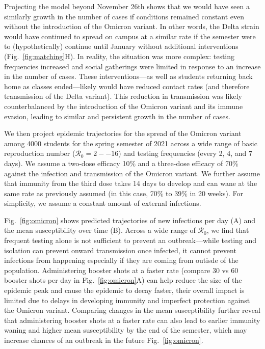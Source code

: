 \documentclass[12pt]{article}
\newcommand{\fref}[1]{Fig.~\ref{fig:#1}}
\begin{document}
Projecting the model beyond November 26th shows that we would have seen a similarly growth in the number of cases if conditions remained constant even without the introduction of the Omicron variant.
In other words, the Delta strain would have continued to spread on campus at a similar rate if the semester were to (hypothetically) continue until January without additional interventions (\fref{matching}H).
In reality, the situation was more complex:  testing frequencies increased and social gatherings were limited in response to an increase in the number of cases.
These interventions---as well as students returning back home as classes ended---likely would have reduced contact rates (and therefore transmission of the Delta variant).
This reduction in transmission was likely counterbalanced by the introduction of the Omicron variant and its immune evasion, leading to similar and persistent growth in the number of cases.

We then project epidemic trajectories for the spread of the Omicron variant among 4000 students for the spring semester of 2021 across a wide range of basic reproduction number ($\mathcal R_0 = 2--16$) and testing frequencies (every 2, 4, and 7 days).
We assume a two-dose efficacy 10\% and a three-dose efficacy of 70\% against the infection and transmission of the Omicron variant. 
We further assume that immunity from the third dose takes 14 days to develop and can wane at the same rate as previously assumed (in this case, 70\% to 39\% in 20 weeks).
For simplicity, we assume a constant amount of external infections.

\fref{omicron} shows predicted trajectories of new infections per day (A) and the mean susceptibility over time (B).
Across a wide range of $\mathcal R_0$, we find that frequent testing alone is not sufficient to prevent an outbreak---while testing and isolation can prevent onward transmission once infected, it cannot prevent infections from happening especially if they are coming from outisde of the population.
Administering booster shots at a faster rate (compare 30 vs 60 booster shots per day in \fref{omicron}A) can help reduce the size of the epidemic peak and cause the epidemic to decay faster, their overall impact is limited due to delays in developing immunity and imperfect protection against the Omicron variant.
Comparing changes in the mean susceptibility further reveal that administering booster shots at a faster rate can also lead to earlier immunity waning and higher mean susceptibility by the end of the semester, which may increase chances of an outbreak in the future \fref{omicron}.
\end{document}
